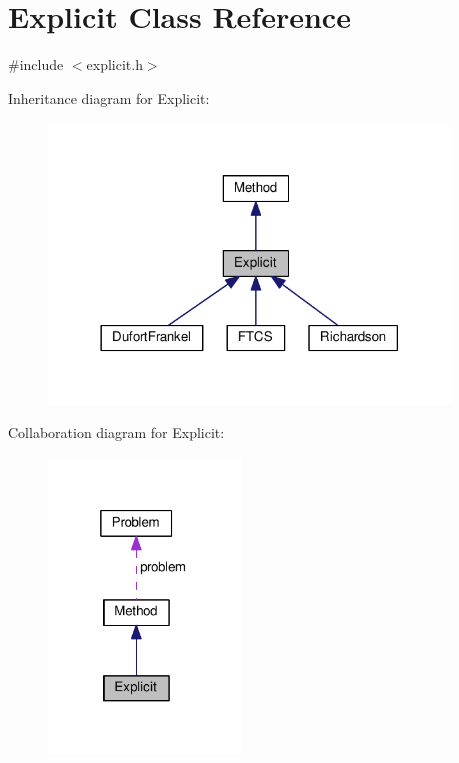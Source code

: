 \hypertarget{classExplicit}{}\section{Explicit Class Reference}
\label{classExplicit}


{\ttfamily \#include $<$explicit.\+h$>$}



Inheritance diagram for Explicit\+:
\nopagebreak
\begin{figure}[H]
\begin{center}
\leavevmode
\includegraphics[width=302pt]{classExplicit__inherit__graph}
\end{center}
\end{figure}


Collaboration diagram for Explicit\+:
\nopagebreak
\begin{figure}[H]
\begin{center}
\leavevmode
\includegraphics[width=145pt]{classExplicit__coll__graph}
\end{center}
\end{figure}
